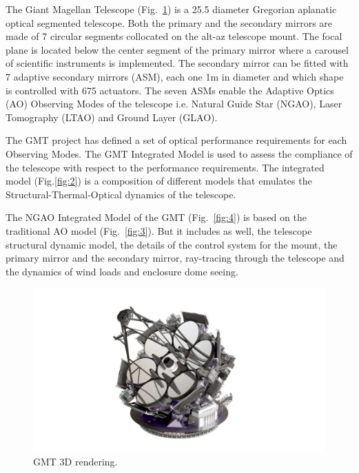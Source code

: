 \documentclass[]{AO4ELT}  %
\begin{document}
The Giant Magellan Telescope (Fig.~\ref{fig:1}) is a 25.5 diameter Gregorian aplanatic optical segmented telescope.
Both the primary and the secondary mirrors are made of 7 circular segments collocated on the alt-az telescope mount.
The focal plane is located below the center segment of the primary mirror where a carousel of scientific instruments is implemented.
The secondary mirror can be fitted with 7 adaptive secondary mirrors (ASM), each one 1m in diameter and which shape is controlled with 675 actuators.
The seven ASMs enable the Adaptive Optics (AO) Observing Modes of the telescope i.e. Natural Guide Star (NGAO), Laser Tomography (LTAO) and Ground Layer (GLAO).

The GMT project has defined a set of optical performance requirements for each Observing Modes.
The GMT Integrated Model is used to assess the compliance of the telescope with respect to the performance requirements.
The integrated model (Fig.\ref{fig:2}) is a composition of different models that emulates the Structural-Thermal-Optical dynamics of the telescope.

The NGAO Integrated Model of the GMT (Fig.~\ref{fig:4}) is based on the traditional AO model (Fig.~\ref{fig:3}).
But it includes as well, the telescope structural dynamic model, the details of the control system for the mount, the primary mirror and the secondary mirror,
ray-tracing through the telescope and the dynamics of wind loads and enclosure dome seeing.


\begin{figure}
   \centering
   \includegraphics[trim=8cm 1cm 9cm 2cm,clip,scale=0.6]{./figures/gmt-pretty.png}
   \caption{GMT 3D rendering.}
   \label{fig:1}
\end{figure}
\end{document}
